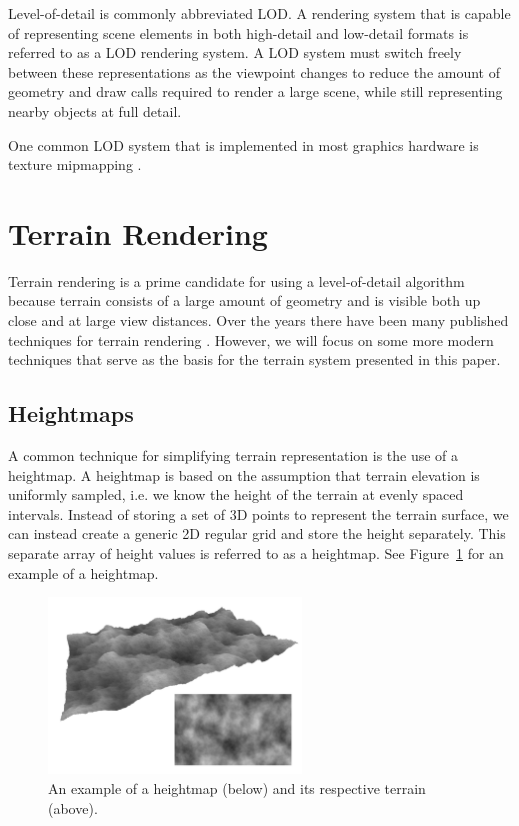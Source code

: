 Level-of-detail is commonly abbreviated LOD.
A rendering system that is capable of representing scene elements in both high-detail and low-detail formats is referred to as a LOD rendering system.
A LOD system must switch freely between these representations as the viewpoint changes to reduce the amount of geometry and draw calls required to render a large scene, while still representing nearby objects at full detail.

One common LOD system that is implemented in most graphics hardware is texture mipmapping \cite{opengl_mipmaps}.


\section{Terrain Rendering} \label{terrain_render}

Terrain rendering is a prime candidate for using a level-of-detail algorithm because terrain consists of a large amount of geometry and is visible both up close and at large view distances.
Over the years there have been many published techniques for terrain rendering
\cite{hardware_lod}
\cite{roambetter}
\cite{bruneton_terrain}
\cite{p-bdam}
\cite{righttri}
\cite{diamondterrain}
\cite{roam}
\cite{clod}.
However, we will focus on some more modern techniques that serve as the basis for the terrain system presented in this paper.


\subsection{Heightmaps}

A common technique for simplifying terrain representation is the use of a heightmap.
A heightmap is based on the assumption that terrain elevation is uniformly sampled, i.e. we know the height of the terrain at evenly spaced intervals.
Instead of storing a set of 3D points to represent the terrain surface, we can instead create a generic 2D regular grid and store the height separately.
This separate array of height values is referred to as a heightmap.
See Figure~\ref{fig:hm} for an example of a heightmap.

\begin{figure}
	\centering
		\includegraphics[width=0.6\textwidth]{figures/heightmap.jpg}
	\caption{An example of a heightmap (below) and its respective terrain (above).}
	\label{fig:hm}
\end{figure}

